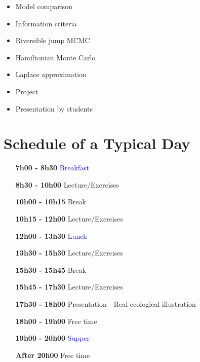 \documentclass[12]{article}
\begin{document}
    \begin{itemize}[leftmargin=2.5cm]
      \item Model comparison
      \item Information criteria
      \item Riversible jump MCMC
      \item Hamiltonian Monte Carlo
      \item Laplace approximation
      \item Project
      \item Presentation by students
    \end{itemize}

    \section*{Schedule of a Typical Day}

    \begin{itemize}[leftmargin=2.5cm]
      \item[\bf 7h00 - 8h30] \textcolor{blue}{Breakfast}
      \item[\bf 8h30 - 10h00] Lecture/Exercises
      \item[\bf 10h00 - 10h15] \textcolor{green!50!black}{Break}
      \item[\bf 10h15 - 12h00] Lecture/Exercises
      \item[\bf 12h00 - 13h30] \textcolor{blue}{Lunch}
      \item[\bf 13h30 - 15h30] Lecture/Exercises
      \item[\bf 15h30 - 15h45] \textcolor{green!50!black}{Break}
      \item[\bf 15h45 - 17h30] Lecture/Exercises
      \item[\bf 17h30 - 18h00] Presentation - Real ecological illustration
      \item[\bf 18h00 - 19h00] \textcolor{green!50!black}{Free time}
      \item[\bf 19h00 - 20h00] \textcolor{blue}{Supper}
      \item[\bf After 20h00] \textcolor{green!50!black}{Free time}
    \end{itemize}
\end{document}
